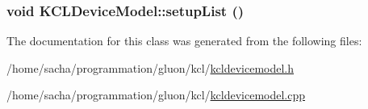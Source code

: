 \hypertarget{class_k_c_l_device_model_ed625ef5cc19fc60dfc92861b64d9656}{
\subsubsection[{setupList}]{\setlength{\rightskip}{0pt plus 5cm}void KCLDeviceModel::setupList ()}}
\label{class_k_c_l_device_model_ed625ef5cc19fc60dfc92861b64d9656}




The documentation for this class was generated from the following files:\begin{CompactItemize}
\item 
/home/sacha/programmation/gluon/kcl/\hyperlink{kcldevicemodel_8h}{kcldevicemodel.h}\item 
/home/sacha/programmation/gluon/kcl/\hyperlink{kcldevicemodel_8cpp}{kcldevicemodel.cpp}\end{CompactItemize}
